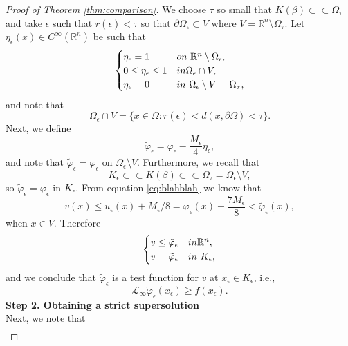 \documentclass[10pt,a4paper]{amsart}
\providecommand{\Linf}{\mathcal{L}_{\infty}}
\providecommand{\Rn}{\mathbb{R}^n}
\begin{document}
\begin{proof}[Proof of Theorem \ref{thm:comparison}]
We choose $\tau$ so small that $K(\beta) \subset \subset \Omega_{\tau}$ and take $\epsilon$ such that $r(\epsilon) < \tau$ so that $\partial \Omega_{\epsilon} \subset V$ where $V = \Rn \setminus \Omega_{\tau}$. Let $\eta_{\epsilon}(x) \in C^{\infty}(\Rn)$ be such that
\begin{align*}
     \begin{cases}
                   \eta_{\epsilon} = 1 & \textup{on  } \ \Rn \setminus \Omega_{\epsilon}, \\
                    0 \leq \eta_{\epsilon} \leq 1 & \textup{in  } \Omega_{\epsilon} \cap V, \\
                    \eta_{\epsilon} =0  & \textup{in  } \ \Omega_{\epsilon} \setminus V = \Omega_{\tau},
     \end{cases}
\end{align*}
and note that
$$
\Omega_{\epsilon} \cap V = \{x \in \Omega: r(\epsilon) < d(x, \partial \Omega) < \tau \}.
$$
Next, we define
\begin{equation*}
     \tilde{\varphi}_{\epsilon} = 
                \varphi_{\epsilon} -\frac{M_{\epsilon}}{4} \eta_{\epsilon},
\end{equation*}
and note that $\tilde{\varphi}_{\epsilon}= \varphi_{\epsilon}$ on $\Omega_{\epsilon} \setminus V$. Furthermore, we recall that 
$$
K_{\epsilon} \subset \subset K(\beta) \subset \subset \Omega_{\tau} = \Omega_{\epsilon} \setminus V,
$$
so $\tilde{\varphi}_{\epsilon} = \varphi_{\epsilon}$ in $K_{\epsilon}$. From equation \eqref{eq:blahblah} we know that
$$
v(x) \leq u_{\epsilon}(x) + M_{\epsilon}/8=\varphi_{\epsilon}(x)-\frac{7 M_{\epsilon}}{8} < \tilde{\varphi}_{\epsilon}(x),
$$
when $x \in V$. Therefore
\begin{align*}
     \begin{cases}
                   v \leq \tilde{\varphi}_{\epsilon} &\textup{in  } \Rn, \\
                   v= \tilde{\varphi}_{\epsilon} &\textup{in  } \ K_{\epsilon},
     \end{cases}
\end{align*}
and we conclude that $\tilde{\varphi}_{\epsilon}$ is a test function for $v$ at $x_{\epsilon} \in K_{\epsilon}$, i.e.,
\begin{equation}
\label{eq:contradiction}
\Linf \tilde{\varphi}_{\epsilon}(x_{\epsilon}) \geq f(x_{\epsilon}).    
\end{equation}
\textbf{Step 2. Obtaining a strict supersolution}\\
Next, we note that
\begin{align}

\end{align}
\end{proof}
\end{document}

